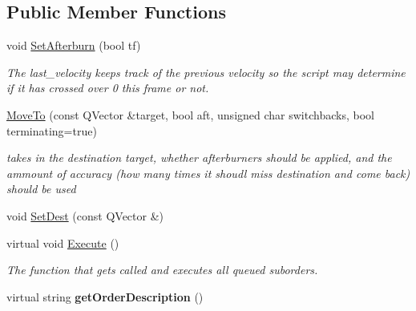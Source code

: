 \subsection*{Public Member Functions}
\begin{DoxyCompactItemize}
\item 
void \hyperlink{classOrders_1_1MoveTo_a91833fc64357e0af10a98587cbcfb390}{Set\+Afterburn} (bool tf)\hypertarget{classOrders_1_1MoveTo_a91833fc64357e0af10a98587cbcfb390}{}\label{classOrders_1_1MoveTo_a91833fc64357e0af10a98587cbcfb390}

\begin{DoxyCompactList}\small\item\em The last\+\_\+velocity keeps track of the previous velocity so the script may determine if it has crossed over 0 this frame or not. \end{DoxyCompactList}\item 
\hyperlink{classOrders_1_1MoveTo_a5ad0f90fb74a19d638b287e2a45debb5}{Move\+To} (const Q\+Vector \&target, bool aft, unsigned char switchbacks, bool terminating=true)\hypertarget{classOrders_1_1MoveTo_a5ad0f90fb74a19d638b287e2a45debb5}{}\label{classOrders_1_1MoveTo_a5ad0f90fb74a19d638b287e2a45debb5}

\begin{DoxyCompactList}\small\item\em takes in the destination target, whether afterburners should be applied, and the ammount of accuracy (how many times it shoudl miss destination and come back) should be used \end{DoxyCompactList}\item 
void \hyperlink{classOrders_1_1MoveTo_a3828d1174d70a6a9430a699f8e6687c8}{Set\+Dest} (const Q\+Vector \&)
\item 
virtual void \hyperlink{classOrders_1_1MoveTo_a582419df298cdfdcf5862364b54dcce3}{Execute} ()\hypertarget{classOrders_1_1MoveTo_a582419df298cdfdcf5862364b54dcce3}{}\label{classOrders_1_1MoveTo_a582419df298cdfdcf5862364b54dcce3}

\begin{DoxyCompactList}\small\item\em The function that gets called and executes all queued suborders. \end{DoxyCompactList}\item 
virtual string {\bfseries get\+Order\+Description} ()\hypertarget{classOrders_1_1MoveTo_aa6cf601b9c8c19f13c619629eec8d324}{}\label{classOrders_1_1MoveTo_aa6cf601b9c8c19f13c619629eec8d324}

\end{DoxyCompactItemize}
